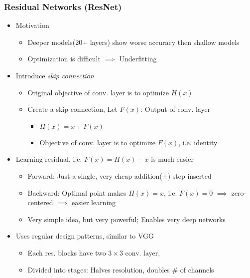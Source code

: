 \subsubsection*{Residual Networks (ResNet)}
\begin{itemize}
    \item Motivation
    \begin{itemize}
        \item Deeper models(20+ layers) show worse accuracy then shallow models
        \item Optimization is difficult $\implies$ Underfitting
    \end{itemize}
    \item Introduce \textit{skip connection}
    \begin{itemize}
        \item Original objective of conv. layer is to optimize $H(x)$
        \item Create a skip connection, Let $F(x)$: Output of conv. layer
        \begin{itemize}
            \item $H(x)=x+F(x)$
            \item Objective of conv. layer is to optimize $F(x)$, i.e. identity
        \end{itemize}
    \end{itemize}
    \begin{figures}
    \end{figures}
    \item Learning residual, i.e. $F(x)=H(x)-x$ is much easier
    \begin{itemize}
        \item Forward: Just a single, very cheap addition(+) step inserted
        \item Backward: Optimal point makes $H(x)=x$, i.e. $F(x)=0$ $\implies$ zero-centered $\implies$ easier learning
        \item Very simple idea, but very powerful; Enables very deep networks
    \end{itemize}
    \item Uses regular design patterns, similar to VGG
    \begin{itemize}
        \item Each res. blocks have two $3\times3$ conv. layer,
        \item Divided into stages: Halves resolution, doubles \# of channels
    \end{itemize}

\end{itemize}

